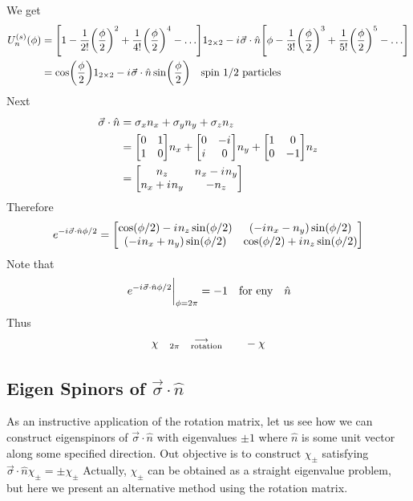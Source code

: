 We get
\begin{align}
U_n^{(s)}\qty(\phi) 
&= \qty[1 - \frac{1}{2!} \qty(\frac{\phi}{2})^2 + \frac{1}{4 !} \qty(\frac{\phi}{2})^4 - \ldots] 1_{2\times 2}
- \iu \vec{\sigma} \cdot \hat{n} \qty[\phi - \frac{1}{3 !} \qty(\frac{\phi}{2})^3 + \frac{1}{5 !} \qty(\frac{\phi}{2})^5 - \ldots] \nonumber\\
&= \cos(\frac{\phi}{2}) 1_{2\times 2} - \iu \vec{\sigma} \cdot \hat{n} \sin(\frac{\phi}{2}) \qq{spin 1/2 particles}
\end{align}
Next
\begin{align*}
\vec{\sigma} \cdot \hat{n} 
&= \sigma_x n_x + \sigma_y n_y + \sigma_z n_z \\
&= \mqty[0 & 1 \\ 1 & 0] n_x + \mqty[0 & -\iu \\ \iu & 0] n_y + \mqty[1 & 0 \\ 0 & -1] n_z \\
&= \mqty[n_z & n_x - \iu n_y \\ n_x + \iu n_y & -n_z]
\end{align*}
Therefore
\begin{equation}
e^{-\iu \vec{\sigma} \cdot \hat{n} \phi/2} = \mqty[\cos(\phi/2) - \iu n_z \sin(\phi/2) & \qty(- \iu n_x - n_y) \sin(\phi/2) \\
\qty(-\iu n_x + n_y) \sin(\phi/2) & \cos(\phi/2) + \iu n_z \sin(\phi/2)]
\end{equation}
Note that
\begin{equation}
\eval{e^{-\iu \vec{\sigma}\cdot \hat{n}\phi/2}}_{\phi=2 \pi} = -1 \qq{for eny} \hat{n}
\end{equation}
Thus
\begin{align}
\chi \quad \substack{\longrightarrow \\ 2\pi \qq{rotation}} \quad - \chi
\end{align}



\subsection{Eigen Spinors of \texorpdfstring{$\vec{\sigma} \cdot \hat{n}$}{PDFstring}}
As an instructive application of the rotation matrix, let us see how we can construct eigenspinors of $\vec{\sigma}\cdot \hat{n}$ with eigenvalues $\pm 1$ where $\hat{n}$ is some unit vector along some specified direction. Out objective is to construct $\chi_{\pm}$ satisfying $\vec{\sigma} \cdot \hat{n} \chi_{\pm} = \pm \chi_{\pm}$
Actually, $\chi_{\pm}$ can be obtained as a  straight eigenvalue problem, but here we present an alternative method using the rotation matrix.


